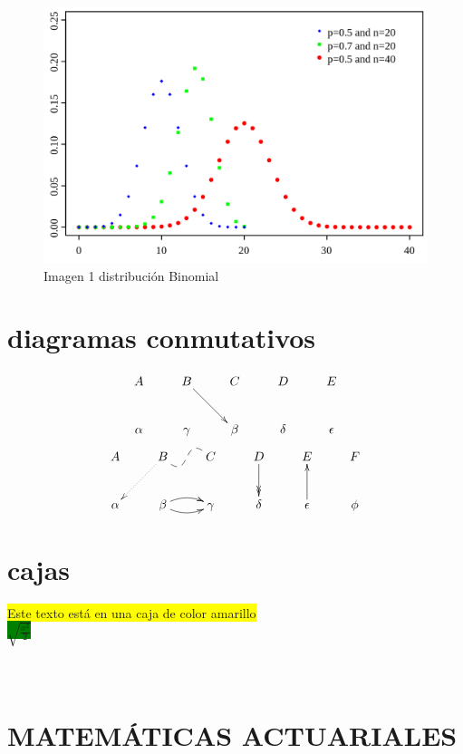 \documentclass{article}
\numberwithin{equation}{section}
\theoremstyle{plain}  %
\begin{document}
\begin{figure}[h]
    \centering
    \includegraphics[scale=0.3]{imagen1.png}
    \caption{Imagen 1 distribución Binomial}
    \end{figure}

\newpage

\section{diagramas conmutativos}
\[
\xymatrix{
A & B \ar[rd] & C & D & E\\
\alpha & \gamma & \beta & \delta
& \epsilon
}
\]
\[
\xymatrix{
A & B \ar@{.>}[ld] \ar@{--}@(dr,ul)[r]
& C & D \ar@{->>}[d] & E \ar@{<-}[d]
& F \\ \alpha & \beta \ar@/^/[r] \ar@/_/[r]
& \gamma & \delta & \epsilon & \phi
}
\]
\newpage
\section{cajas}
\colorbox{yellow}{Este texto está en una caja de color amarillo} \\
\colorbox{green}{$\sqrt{\frac{x^2}{2}}$} \\ 
\\
 \\ 

\newpage

\section{MATEMÁTICAS ACTUARIALES}
\end{document}
